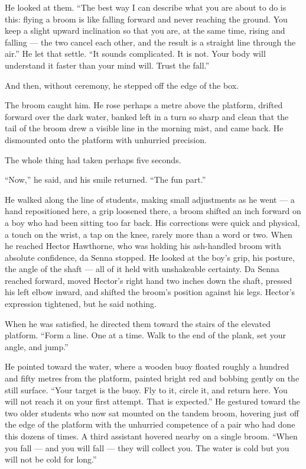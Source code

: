 He looked at them. \enquote{The best way I can describe what you are about to do is this: flying a broom is like falling forward and never reaching the ground. You keep a slight upward inclination so that you are, at the same time, rising and falling --- the two cancel each other, and the result is a straight line through the air.} He let that settle. \enquote{It sounds complicated. It is not. Your body will understand it faster than your mind will. Trust the fall.}
 
And then, without ceremony, he stepped off the edge of the box.
 
The broom caught him. He rose perhaps a metre above the platform, drifted forward over the dark water, banked left in a turn so sharp and clean that the tail of the broom drew a visible line in the morning mist, and came back. He dismounted onto the platform with unhurried precision.
 
The whole thing had taken perhaps five seconds.
 
\enquote{Now,} he said, and his smile returned. \enquote{The fun part.}
 
He walked along the line of students, making small adjustments as he went --- a hand repositioned here, a grip loosened there, a broom shifted an inch forward on a boy who had been sitting too far back. His corrections were quick and physical, a touch on the wrist, a tap on the knee, rarely more than a word or two. When he reached Hector Hawthorne, who was holding his ash-handled broom with absolute confidence, da Senna stopped. He looked at the boy's grip, his posture, the angle of the shaft --- all of it held with unshakeable certainty. Da Senna reached forward, moved Hector's right hand two inches down the shaft, pressed his left elbow inward, and shifted the broom's position against his legs. Hector's expression tightened, but he said nothing.
 
When he was satisfied, he directed them toward the stairs of the elevated platform. \enquote{Form a line. One at a time. Walk to the end of the plank, set your angle, and jump.}
 
He pointed toward the water, where a wooden buoy floated roughly a hundred and fifty metres from the platform, painted bright red and bobbing gently on the still surface. \enquote{Your target is the buoy. Fly to it, circle it, and return here. You will not reach it on your first attempt. That is expected.} He gestured toward the two older students who now sat mounted on the tandem broom, hovering just off the edge of the platform with the unhurried competence of a pair who had done this dozens of times. A third assistant hovered nearby on a single broom. \enquote{When you fall --- and you will fall --- they will collect you. The water is cold but you will not be cold for long.}
 
